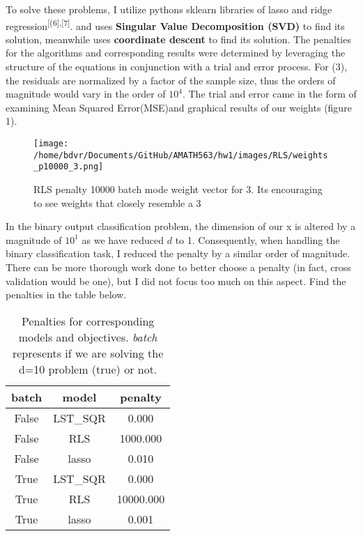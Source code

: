 \documentclass[12pt]{article}
\begin{document}
	To solve these problems, I utilize pythons sklearn libraries of lasso and ridge regression\textsuperscript{[(6],[7]}.  and  uses \textbf{Singular Value Decomposition (SVD)} to find its solution, meanwhile  uses \textbf{coordinate descent} to find its solution. The penalties for the algorithms and corresponding results were determined by leveraging the structure of the equations in conjunction with a trial and error process. For (3), the residuals are normalized by a factor of the sample size, thus the orders of magnitude would vary in the order of $10^4$. The trial and error came in the form  of examining Mean Squared Error(MSE)and graphical results of our weights (figure 1). 
	\begin{figure}[H]
		\caption{RLS penalty 10000 batch mode weight vector for 3. Its encouraging to see weights that closely resemble a 3}
		\centering
		\texttt{[image: /home/bdvr/Documents/GitHub/AMATH563/hw1/images/RLS/weights\_p10000\_3.png]}
	\end{figure}
	\par
	In the binary output classification problem, the dimension of our x is altered by a magnitude of $10^1$ as we have reduced $d$ to 1. Consequently, when handling the binary classification task, I reduced the penalty by a similar order of magnitude. There can be more thorough work done to better choose a penalty (in fact, cross validation would be one), but I did not focus too much on this aspect. Find the penalties in the table below.
	\begin{table}[H]
	\begin{center}
		\begin{tabular}{ccc}
			\toprule
			batch & model & penalty \\
			\midrule
			False & LST\_SQR &  0.000 \\
			False & RLS & 1000.000\\
			False &  lasso & 0.010 \\
			True &  LST\_SQR &  0.000 \\
			True & RLS &  10000.000 \\
			True & lasso & 0.001 \\
			\bottomrule
		\end{tabular}
		\caption{Penalties for corresponding models and objectives. \textit{batch} represents if we are solving the d=10 problem (true) or not.}
	\end{center}
	\end{table}
	
\end{document}
